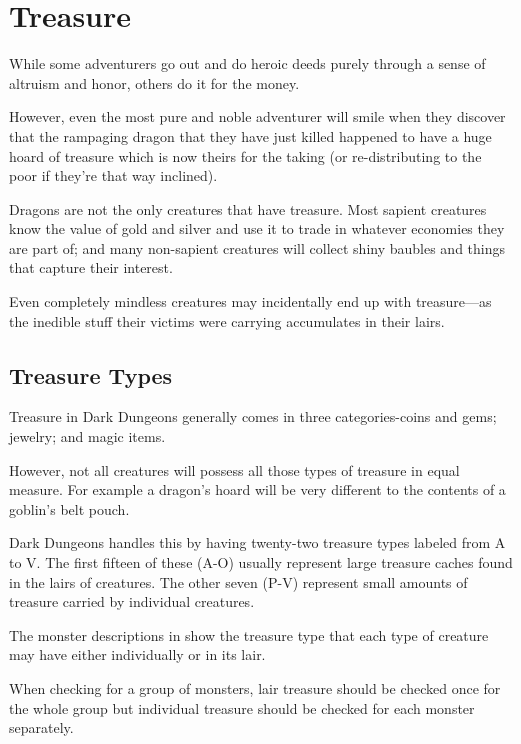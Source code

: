 \chapter[purple]{Treasure}
\label{chap:Treasure}
\thispagestyle{plain}

\begin{multicols*}{2}
While some adventurers go out and do heroic deeds purely through a sense of altruism and honor, others do it for the money.

However, even the most pure and noble adventurer will smile when they discover that the rampaging dragon that they have just killed happened to have a huge hoard of treasure which is now theirs for the taking (or re-distributing to the poor if they’re that way inclined).

Dragons are not the only creatures that have treasure. Most sapient creatures know the value of gold and silver and use it to trade in whatever economies they are part of; and many non-sapient creatures will collect shiny baubles and things that capture their interest.

Even completely mindless creatures may incidentally end up with treasure—as the inedible stuff their victims were carrying accumulates in their lairs.

\section{Treasure Types}\label{sec:Treasure Types}
Treasure in Dark Dungeons generally comes in three categories-coins and gems; jewelry; and magic items.

However, not all creatures will possess all those types of treasure in equal measure. For example a dragon’s hoard will be very different to the contents of a goblin’s belt pouch.

Dark Dungeons handles this by having twenty-two treasure types labeled from A to V. The first fifteen of these (A-O) usually represent large treasure caches found in the lairs of creatures. The other seven (P-V) represent small amounts of treasure carried by individual creatures.

The monster descriptions in  show the treasure type that each type of creature may have either individually or in its lair.

When checking for a group of monsters, lair treasure should be checked once for the whole group but individual treasure should be checked for each monster separately.


\end{multicols*}
